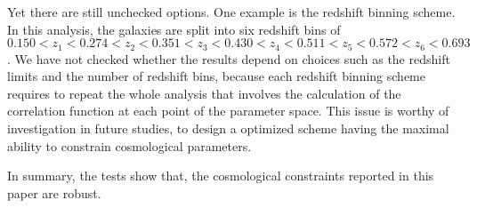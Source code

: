 \documentclass[iop]{emulateapj}
\begin{document}


Yet there are still unchecked options. 
One example is the redshift binning scheme.
In this analysis, the galaxies are split into six redshift bins of
$0.150<z_1<0.274<z_2<0.351<z_3<0.430<z_4<0.511<z_5<0.572<z_6<0.693$.
We have not checked whether the results depend on choices such as the redshift limits and the number of redshift bins,
because each redshift binning scheme requires to repeat the whole analysis that involves the calculation of the correlation function 
at each point of the parameter space.
This issue is worthy of investigation in future studies, 
to design a optimized scheme having the maximal ability to constrain cosmological parameters.

In summary, the tests show that, the cosmological constraints reported in this paper are robust.


\
\end{document}
